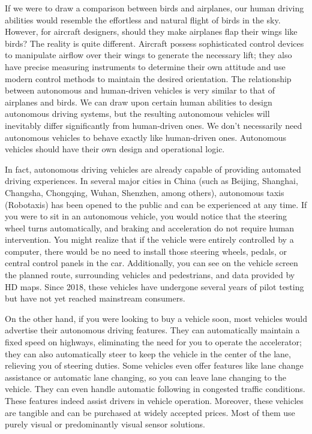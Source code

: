 If we were to draw a comparison between birds and airplanes, our human driving abilities would resemble the effortless and natural flight of birds in the sky. However, for aircraft designers, should they make airplanes flap their wings like birds? The reality is quite different. Aircraft possess sophisticated control devices to manipulate airflow over their wings to generate the necessary lift; they also have precise measuring instruments to determine their own attitude and use modern control methods to maintain the desired orientation. The relationship between autonomous and human-driven vehicles is very similar to that of airplanes and birds. We can draw upon certain human abilities to design autonomous driving systems, but the resulting autonomous vehicles will inevitably differ significantly from human-driven ones. We don't necessarily need autonomous vehicles to behave exactly like human-driven ones. Autonomous vehicles should have their own design and operational logic.

In fact, autonomous driving vehicles are already capable of providing automated driving experiences. In several major cities in China (such as Beijing, Shanghai, Changsha, Chongqing, Wuhan, Shenzhen, among others), autonomous taxis (Robotaxis) has been opened to the public and can be experienced at any time. If you were to sit in an autonomous vehicle, you would notice that the steering wheel turns automatically, and braking and acceleration do not require human intervention. You might realize that if the vehicle were entirely controlled by a computer, there would be no need to install those steering wheels, pedals, or central control panels in the car. Additionally, you can see on the vehicle screen the planned route, surrounding vehicles and pedestrians, and data provided by HD maps. Since 2018, these vehicles have undergone several years of pilot testing but have not yet reached mainstream consumers.

On the other hand, if you were looking to buy a vehicle soon, most vehicles would advertise their autonomous driving features. They can automatically maintain a fixed speed on highways, eliminating the need for you to operate the accelerator; they can also automatically steer to keep the vehicle in the center of the lane, relieving you of steering duties. Some vehicles even offer features like lane change assistance or automatic lane changing, so you can leave lane changing to the vehicle. They can even handle automatic following in congested traffic conditions. These features indeed assist drivers in vehicle operation. Moreover, these vehicles are tangible and can be purchased at widely accepted prices. Most of them use purely visual or predominantly visual sensor solutions.

